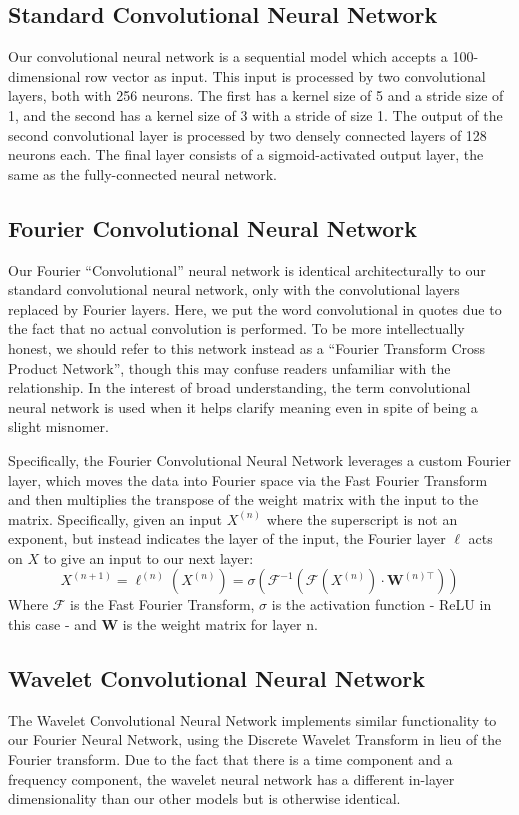 \subsection{Standard Convolutional Neural Network}
Our convolutional neural network is a sequential model which accepts a 100-dimensional row vector as input.
This input is processed by two convolutional layers, both with 256 neurons.
The first has a kernel size of 5 and a stride size of 1, and the second has a kernel size of 3 with a stride of size 1.
The output of the second convolutional layer is processed by two densely connected layers of 128 neurons each. 
The final layer consists of a sigmoid-activated output layer, the same as the fully-connected neural network.

\subsection{Fourier Convolutional Neural Network}
Our Fourier ``Convolutional'' neural network is identical architecturally to our standard convolutional neural network, only with the convolutional layers replaced by Fourier layers.
Here, we put the word convolutional in quotes due to the fact that no actual convolution is performed.
To be more intellectually honest, we should refer to this network instead as a ``Fourier Transform Cross Product Network'', though this may confuse readers unfamiliar with the relationship.
In the interest of broad understanding, the term convolutional neural network is used when it helps clarify meaning even in spite of being a slight misnomer.

Specifically, the Fourier Convolutional Neural Network leverages a custom Fourier layer, which moves the data into Fourier space via the Fast Fourier Transform and then multiplies the transpose of the weight matrix with the input to the matrix.
Specifically, given an input $X^{(n)}$ where the superscript is not an exponent, but instead indicates the layer of the input, the Fourier layer $\ell$ acts on $X$ to give an input to our next layer:
\begin{equation}
X^{(n+1)} = \ell^{(n)}(X^{(n)}) = \sigma(\mathcal{F}^{-1}(\mathcal{F}(X^{(n)})\cdot \mathbf{W}^{(n)\top}))
\end{equation}
\noindent Where $\mathcal{F}$ is the Fast Fourier Transform, $\sigma$ is the activation function - ReLU in this case - and $\mathbf{W}$ is the weight matrix for layer n.

\subsection{Wavelet Convolutional Neural Network} \label{wavelet cnn}
The Wavelet Convolutional Neural Network implements similar functionality to our Fourier Neural Network, using the Discrete Wavelet Transform in lieu of the Fourier transform.
Due to the fact that there is a time component and a frequency component, the wavelet neural network has a different in-layer dimensionality than our other models but is otherwise identical.

